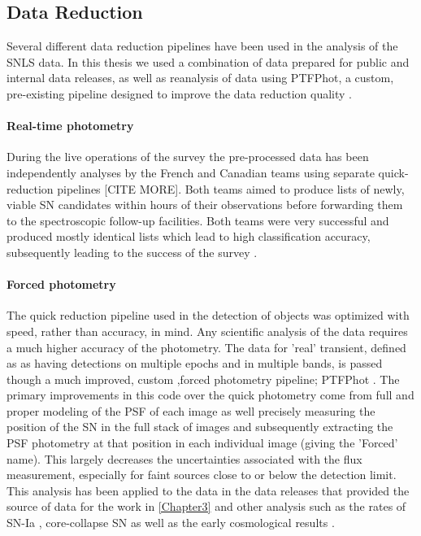 \subsection{Data Reduction}
Several different data reduction pipelines have been used in the analysis of the SNLS data. In this thesis we used a combination of data prepared for public and internal data releases, as well as reanalysis of data using PTFPhot, a custom, pre-existing pipeline designed to improve the data reduction quality \citep{Firth2015TheSupernovae}.

\paragraph{Real-time photometry}
During the live operations of the survey the pre-processed data has been independently analyses by the French and Canadian teams using separate quick-reduction pipelines \citep{Bazin2011} [CITE MORE]. Both teams aimed to produce lists of newly, viable SN candidates within hours of their observations before forwarding them to the spectroscopic follow-up facilities. Both teams were very successful and produced mostly identical lists which lead to high classification accuracy, subsequently leading to the success of the survey \citep{Pritchet2004SNLSSurvey}.\\

\paragraph{Forced photometry}
The quick reduction pipeline used in the detection of objects was optimized with speed, rather than accuracy, in mind. Any scientific analysis of the data requires a much higher accuracy of the photometry. The data for 'real' transient, defined as as having detections on multiple epochs and in multiple bands, is passed though a much improved, custom ,forced photometry pipeline; PTFPhot \citep{Firth2015TheSupernovae}. The primary improvements in this code over the quick photometry come from full and proper modeling of the PSF of each image as well precisely measuring the position of the SN in the full stack of images and subsequently extracting the PSF photometry at that position in each individual image (giving the 'Forced' name). This largely decreases the uncertainties associated with the flux measurement, especially for faint sources close to or below the detection limit. This analysis has been applied to the data in the data releases that provided the source of data for the work in \cref{Chapter3} and other analysis such as the rates of SN-Ia \citep{Perrett2012EVOLUTIONSURVEY}, core-collapse SN \citep{Bazin2009} as well as the early cosmological results \citep{Sullivan2011SNLS3:PROBES}. \\

